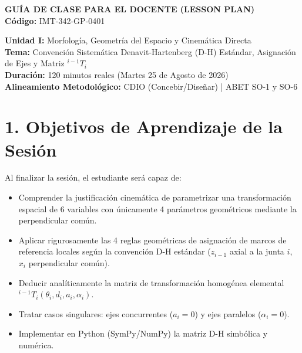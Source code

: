 \documentclass[11pt, a4paper]{article}
\begin{document}
\begin{center}
    \Large\textbf{\textcolor{ucbblue}{GUÍA DE CLASE PARA EL DOCENTE (LESSON PLAN)}}\\
    \vspace{0.2cm}
    \normalsize\textbf{Código:} IMT-342-GP-0401
\end{center}
\vspace{0.3cm}

\noindent\textbf{Unidad I:} Morfología, Geometría del Espacio y Cinemática Directa \\
\textbf{Tema:} Convención Sistemática Denavit-Hartenberg (D-H) Estándar, Asignación de Ejes y Matriz $^{i-1}T_i$ \\
\textbf{Duración:} 120 minutos reales (Martes 25 de Agosto de 2026) \\
\textbf{Alineamiento Metodológico:} CDIO (Concebir/Diseñar) | ABET SO-1 y SO-6

\section*{1. Objetivos de Aprendizaje de la Sesión}
Al finalizar la sesión, el estudiante será capaz de:
\begin{itemize}[label=\textcolor{ucbblue}{$\circ$}]
    \item Comprender la justificación cinemática de parametrizar una transformación espacial de 6 variables con únicamente 4 parámetros geométricos mediante la perpendicular común.
    \item Aplicar rigurosamente las 4 reglas geométricas de asignación de marcos de referencia locales según la convención D-H estándar ($z_{i-1}$ axial a la junta $i$, $x_i$ perpendicular común).
    \item Deducir analíticamente la matriz de transformación homogénea elemental $^{i-1}T_i(\theta_i, d_i, a_i, \alpha_i)$.
    \item Tratar casos singulares: ejes concurrentes ($a_i = 0$) y ejes paralelos ($\alpha_i = 0$).
    \item Implementar en Python (SymPy/NumPy) la matriz D-H simbólica y numérica.
\end{itemize}
\end{document}
